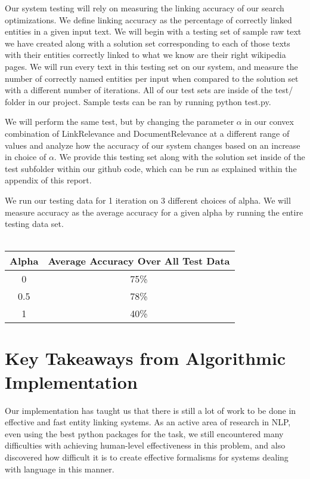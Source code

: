\documentclass[twoside,11pt]{article}
\begin{document}
Our system testing will rely on measuring the linking accuracy of our search optimizations. We define linking accuracy as the percentage of correctly linked entities in a given input text. We will begin with a testing set of sample raw text we have created along with a solution set corresponding to each of those texts with their entities correctly linked to what we know are their right wikipedia pages. We will run every text in this testing set on our system, and measure the number of correctly named entities per input when compared to the solution set with a different number of iterations. All of our test sets are inside of the test/ folder in our project. Sample tests can be ran by running python test.py.

We will perform the same test, but by changing the parameter $\alpha$ in our convex combination of LinkRelevance and DocumentRelevance at a different range of values and analyze how the accuracy of our system changes based on an increase in choice of $\alpha$. We provide this testing set along with the solution set inside of the test subfolder within our github code, which can be run as explained within the appendix of this report.

We run our testing data for 1 iteration on 3 different choices of alpha. We will measure accuracy as the average accuracy for a given alpha by running the entire testing data set.
\\ \\
\begin{tabular}{cc}
\hline
\textbf{Alpha}            & \textbf{Average Accuracy Over All Test Data} \\ \hline
\multicolumn{1}{|c|}{0}   & \multicolumn{1}{c|}{75\%}                    \\ \hline
\multicolumn{1}{|c|}{0.5} & \multicolumn{1}{c|}{78\%}                    \\ \hline
\multicolumn{1}{|c|}{1}   & \multicolumn{1}{c|}{40\%}                    \\ \hline
\end{tabular}

\section{Key Takeaways from Algorithmic Implementation}

Our implementation has taught us that there is still a lot of work to be done in effective and fast entity linking systems. As an active area of research in NLP, even using the best python packages for the task, we still encountered many difficulties with achieving human-level effectiveness in this problem, and also discovered how difficult it is to create effective formalisms for systems dealing with language in this manner.
\end{document}

